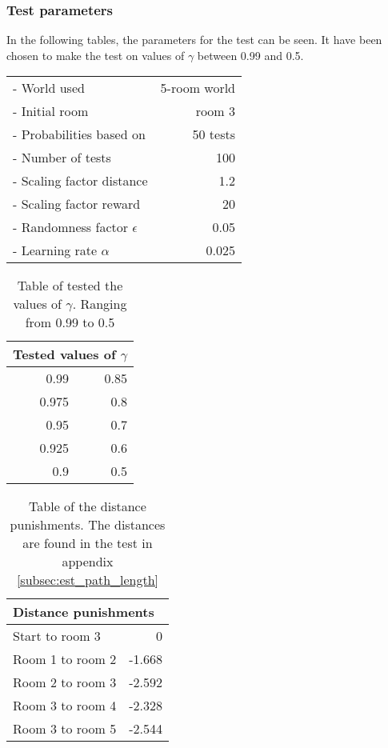 \documentclass[../Head/Main.tex]{subfiles}
\begin{document}
\subsubsection*{Test parameters}
In the following tables, the parameters for the test can be seen. It have been chosen to make the test on values of $\gamma$ between 0.99 and 0.5.\\
\begin{minipage}[c]{0.35\textwidth}
	\begin{tabular}{l r}
	- World used                   & 5-room world\\
	- Initial room                 & room 3\\	
	- Probabilities based on       & 50 tests\\	
	- Number of tests              & 100\\
	- Scaling factor distance      & 1.2\\
	- Scaling factor reward        & 20\\
	- Randomness factor $\epsilon$ & 0.05\\
	- Learning rate $\alpha$       & 0.025\\
	\end{tabular}
\end{minipage}	
\hfill
\begin{minipage}[c]{0.2\textwidth}
	\begin{table}[H]
		\centering
		\begin{tabular}{r r}
		\hline
		\multicolumn{2}{l}{\textbf{Tested values of $\gamma$}}\\ 			\hline
		0.99   & 0.85\\
		0.975  & 0.8\\
		0.95   & 0.7\\
		0.925  & 0.6\\
		0.9    & 0.5\\
		\hline
		\end{tabular}
		\caption{Table of tested the values of $\gamma$. Ranging from 0.99 to 0.5}
		\label{tab:test_gamma}
	\end{table}
\end{minipage}
\hfill
\begin{minipage}[c]{0.3\textwidth}
	\begin{table}[H]
	\centering
	\begin{tabular}{l r}
		\hline
		\multicolumn{2}{l}{\textbf{Distance punishments}}\\ 			\hline
		Start to room 3   & 0\\
		Room 1 to room 2  & -1.668\\
		Room 2 to room 3  & -2.592\\
		Room 3 to room 4  & -2.328\\
		Room 3 to room 5  & -2.544\\
		\hline
	\end{tabular}
	\caption{Table of the distance punishments. The distances are found in the test in appendix \ref{subsec:est_path_length}}
	\label{tab:distance_punishment_5_rooms_2}
\end{table}
\end{minipage}
\end{document}
